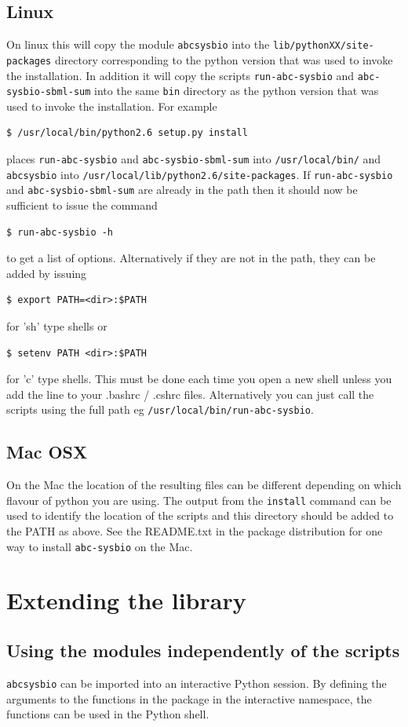 \documentclass[a4paper]{report}
\begin{document}
\section*{Linux}
On linux this will copy the module \verb$abcsysbio$ into the \verb$lib/pythonXX/site-packages$ directory corresponding to the python version that was used to invoke the installation. In addition it will copy the scripts \verb$run-abc-sysbio$ and \verb$abc-sysbio-sbml-sum$ into the same \verb$bin$ directory as the python version that was used to invoke the installation. For example
\begin{verbatim}
$ /usr/local/bin/python2.6 setup.py install
\end{verbatim}
places \verb$run-abc-sysbio$ and \verb$abc-sysbio-sbml-sum$ into \verb$/usr/local/bin/$ and \verb$abcsysbio$ into \verb$/usr/local/lib/python2.6/site-packages$. If \verb$run-abc-sysbio$ and \verb$abc-sysbio-sbml-sum$ are already in the path then it should now be sufficient to issue the command
\begin{verbatim}
$ run-abc-sysbio -h
\end{verbatim}
to get a list of options. Alternatively if they are not in the path, they can be added by issuing
\begin{verbatim}
$ export PATH=<dir>:$PATH 
\end{verbatim}
for 'sh' type shells or
\begin{verbatim}
$ setenv PATH <dir>:$PATH 
\end{verbatim}
for 'c' type shells. This must be done each time you open a new shell unless you add the line to your .bashrc / .cshrc files. Alternatively you can just call the scripts using the full path eg \verb$/usr/local/bin/run-abc-sysbio$.

\section*{Mac OSX}
On the Mac the location of the resulting files can be different depending on which flavour of python you are using. The output from the \verb$install$ command can be used to identify the location of the scripts and this directory should be added to the PATH as above.
See the README.txt in the package distribution for one way to install \verb$abc-sysbio$ on the Mac.

\chapter{Extending the library}
\section{Using the modules independently of the scripts}
\verb$abcsysbio$ can be imported into an interactive Python session. By defining the arguments to the functions in the package in the interactive namespace, the functions can be used in the Python shell.
\end{document}
